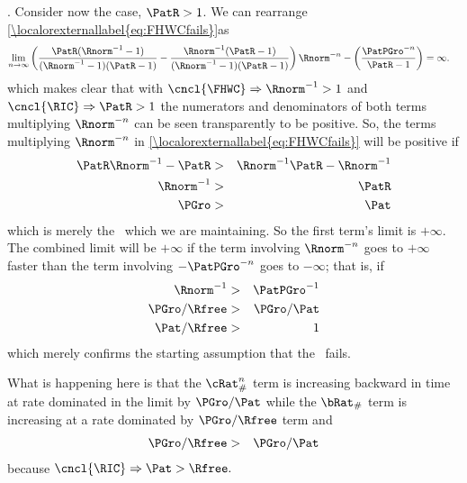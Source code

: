 \documentclass[\econtexRoot/BufferStockTheory]{subfiles}
\begin{document}
.  Consider now the \cncl{\RIC} case, $\PatR > 1$.  We can rearrange \eqref{\localorexternallabel{eq:FHWCfails}}as
\begin{eqnarray}
  \lim_{n \rightarrow \infty} \left(\frac{\PatR(\Rnorm^{-1}-1)}{(\Rnorm^{-1}-1)(\PatR-1)}-\frac{\Rnorm^{-1}(\PatR-1)}{(\Rnorm^{-1}-1)(\PatR-1)}\right)\Rnorm^{-n}-\left(\frac{\PatPGro^{-n}}{\PatR-1}\right)  & = \infty.  
\end{eqnarray}
which makes clear that with $\cncl{\FHWC} \Rightarrow \Rnorm^{-1} > 1$ and $\cncl{\RIC} \Rightarrow \PatR > 1$ the numerators and denominators of both terms multiplying $\Rnorm^{-n}$ can be seen transparently to be positive.  So, the terms multiplying
$\Rnorm^{-n}$ in \eqref{\localorexternallabel{eq:FHWCfails}} will be positive if
\begin{eqnarray*}
  \PatR \Rnorm^{-1} - \PatR  & > & \Rnorm^{-1}\PatR-\Rnorm^{-1}
  \\ \Rnorm^{-1}  & > & \PatR
  \\ \PGro  & > & \Pat
\end{eqnarray*}
which is merely the \PFGIC~which we are maintaining.  So the first term's limit is $+\infty$.  The
combined limit will be $+\infty$ if the term involving $\Rnorm^{-n}$
goes to $+\infty$ faster than the term involving $-\PatPGro^{-n}$ goes to
$-\infty$; that is, if
\begin{eqnarray*}
  \Rnorm^{-1}  & > & \PatPGro^{-1}
  \\ \PGro/\Rfree  & > & \PGro/\Pat
  \\ \Pat/\Rfree  & > & 1
\end{eqnarray*}
which merely confirms the starting assumption that the \RIC~fails.

What is happening here is that the $\cRat_{\#}^{n}$ term is increasing backward in time at rate dominated in the limit by $\PGro/\Pat$ while the $\bRat_{\#}$ term is increasing at a rate dominated by $\PGro/\Rfree$ term and
\begin{eqnarray}
  \PGro/\Rfree & > & \PGro/\Pat 
\end{eqnarray}
because $\cncl{\RIC} \Rightarrow \Pat > \Rfree.$
\end{document}

